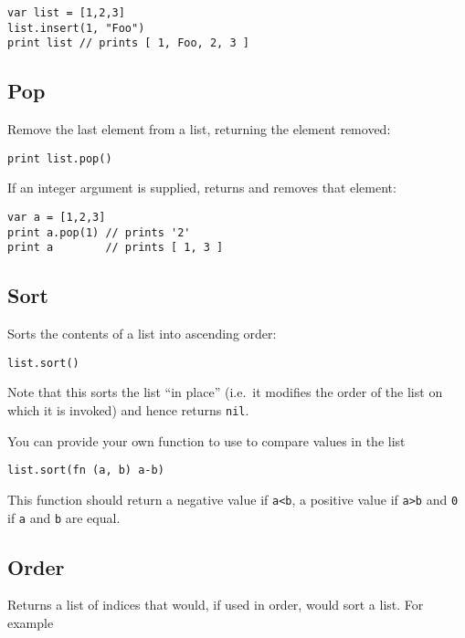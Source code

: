 \begin{lstlisting}
var list = [1,2,3]
list.insert(1, "Foo")
print list // prints [ 1, Foo, 2, 3 ]
\end{lstlisting}

\hypertarget{pop}{%
\subsection{Pop}\label{pop}}

Remove the last element from a list, returning the element removed:

\begin{lstlisting}
print list.pop()
\end{lstlisting}

If an integer argument is supplied, returns and removes that element:

\begin{lstlisting}
var a = [1,2,3]
print a.pop(1) // prints '2'
print a        // prints [ 1, 3 ]
\end{lstlisting}

\hypertarget{sort}{%
\subsection{Sort}\label{sort}}

Sorts the contents of a list into ascending order:

\begin{lstlisting}
list.sort()
\end{lstlisting}

Note that this sorts the list ``in place'' (i.e.~it modifies the order
of the list on which it is invoked) and hence returns \texttt{nil}.

You can provide your own function to use to compare values in the list

\begin{lstlisting}
list.sort(fn (a, b) a-b)
\end{lstlisting}

This function should return a negative value if \texttt{a\textless{}b},
a positive value if \texttt{a\textgreater{}b} and \texttt{0} if
\texttt{a} and \texttt{b} are equal.

\hypertarget{order}{%
\subsection{Order}\label{order}}

Returns a list of indices that would, if used in order, would sort a
list. For example

